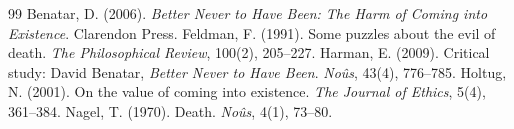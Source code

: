 \documentclass{situationist-preprint}
\begin{document}
\begin{thebibliography}{99}\small
{} Benatar, D. (2006). \emph{Better Never to Have Been: The Harm of Coming into Existence}. Clarendon Press.
 Feldman, F. (1991). Some puzzles about the evil of death. \emph{The Philosophical Review}, 100(2), 205--227.
 Harman, E. (2009). Critical study: David Benatar, \emph{Better Never to Have Been}. \emph{No\^us}, 43(4), 776--785.
 Holtug, N. (2001). On the value of coming into existence. \emph{The Journal of Ethics}, 5(4), 361--384.
 Nagel, T. (1970). Death. \emph{No\^us}, 4(1), 73--80.
\end{thebibliography}
\end{document}
